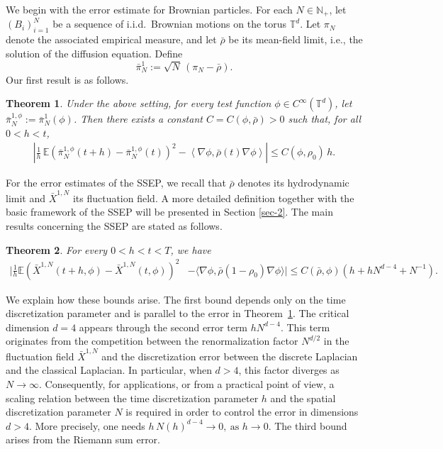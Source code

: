 \documentclass[UTF-8,reqno]{amsart}
\numberwithin{equation}{section}
\newtheorem{theorem}{Theorem}[section]
\def\leq{\leqslant}
\def\leq{\leqslant}
\begin{document}
We begin with the error estimate for Brownian particles. For each $N \in \mathbb{N}_+$, let $(B_i)_{i=1}^N$ be a sequence of i.i.d.\ Brownian motions on the torus $\mathbb{T}^d$. Let $\pi_N$ denote the associated empirical measure, and let $\bar{\rho}$ be its mean-field limit, i.e., the solution of the diffusion equation. Define
$$
\bar{\pi}^1_N := \sqrt{N}\,(\pi_N - \bar{\rho}).
$$
Our first result is as follows.
\begin{theorem}\label{thm-1-intro}
Under the above setting, for every test function $\phi \in C^\infty(\mathbb{T}^d)$, let $\bar{\pi}^{1,\phi}_N := \bar{\pi}^1_N(\phi)$. Then there exists a constant $C = C(\phi, \bar{\rho}) > 0$ such that, for all $0 < h < t$,
\begin{align*}
\left| \frac{1}{h} \, \mathbb{E} \left( \bar{\pi}^{1,\phi}_N(t+h) - \bar{\pi}^{1,\phi}_N(t) \right)^2 - \left\langle \nabla \phi, \bar{\rho}(t) \nabla \phi \right\rangle \right| \leq C(\phi, \rho_0) \, h.
\end{align*}
\end{theorem}


For the error estimates of the SSEP, we recall that $\bar{\rho}$ denotes its hydrodynamic limit and $\bar{X}^{1,N}$ its fluctuation field. A more detailed definition together with the basic framework of the SSEP will be presented in Section \ref{sec-2}. The main results concerning the SSEP are stated as follows. 

\begin{theorem}\label{thm-2-intro}
	For every $0 < h < t < T$, we have
	\begin{align*}
	\Big|\frac{1}{h}\mathbb{E}(\bar{X}^{1,N}(t+h,\phi)-\bar{X}^{1,N}(t,\phi))^2& - \langle \nabla\phi, \bar{\rho}(1-\rho_0) \nabla\phi \rangle \Big|\leq  C(\bar{\rho},\phi)\left(h + hN^{d-4}+N^{-1}\right). 
	\end{align*}
\end{theorem}

We explain how these bounds arise. The first bound depends only on the time discretization parameter and is parallel to the error in Theorem~\ref{thm-1-intro}. The critical dimension $d=4$ appears through the second error term $h N^{d-4}$. This term originates from the competition between the renormalization factor $N^{d/2}$ in the fluctuation field $\bar{X}^{1,N}$ and the discretization error between the discrete Laplacian and the classical Laplacian. In particular, when $d>4$, this factor diverges as $N \to \infty$. Consequently, for applications, or from a practical point of view, a scaling relation between the time discretization parameter $h$ and the spatial discretization parameter $N$ is required in order to control the error in dimensions $d>4$. More precisely, one needs $h\,N(h)^{d-4} \to 0,\ \text{as } h \to 0$. The third bound arises from the Riemann sum error. 
\end{document}
